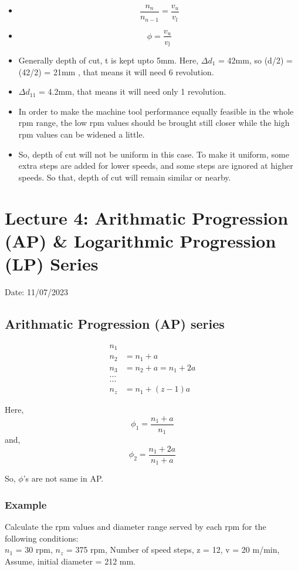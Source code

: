 \documentclass{article}
\begin{document}
\begin{itemize}
  \item $$\frac{n_n}{n_{n-1}} = \frac{v_u}{v_l}$$
  \item $$\phi = \frac{v_u}{v_l}$$
  \item Generally depth of cut, t is kept upto 5mm.  Here, $\Delta d_1$ = 42mm, so (d/2) = (42/2) = 21mm , that means it  will need 6 revolution. 
  \item  $\Delta d_11$ = 4.2mm, that means it  will need only 1 revolution.
  \item In order to make the machine tool performance equally feasible in the
  whole rpm range, the low rpm values should be brought still closer while
  the high rpm values can be widened a little.
  \item So, depth of cut will not be uniform in this case. To make it uniform, some extra steps are added for lower speeds, and some steps are ignored at higher speeds. So that, depth of cut will remain similar or nearby. 
\end{itemize}

\section{Lecture 4: Arithmatic Progression (AP) \& Logarithmic Progression (LP) Series}
\hfill Date: 11/07/2023

\subsection*{Arithmatic Progression (AP) series}
\begin{align*}
  n_1 \\
  n_2 &= n_1 + a \\
  n_3 &= n_2+ a = n_1 + 2a\\
  ...\\
  ...\\
  n_z &= n_1 + (z-1) a 
\end{align*}

Here, $$\phi_1 = \frac{n_1 + a}{n_1}$$
and, $$\phi_2 = \frac{n_1 + 2a}{n_1 + a}$$

So, $\phi$'s are not same in AP. 

\subsubsection*{Example}
Calculate the rpm values and diameter range served by each rpm for
the following conditions:\\
$n_1$ = 30 rpm,
$n_z$ = 375 rpm,
Number of speed steps, z = 12,
v = 20 m/min, Assume, initial diameter = 212 mm.
\end{document}
